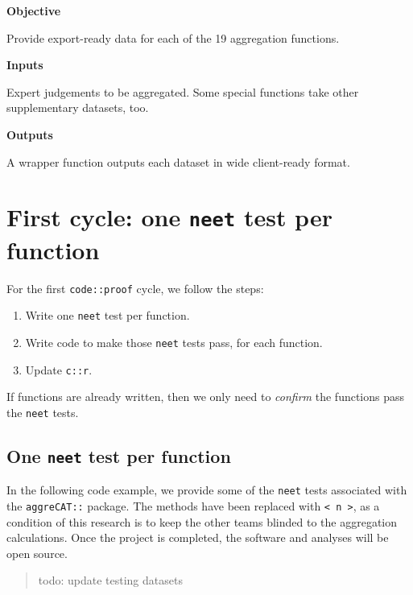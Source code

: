 \documentclass[
]{article}
\providecommand{\tightlist}{%
  \setlength{\itemsep}{0pt}\setlength{\parskip}{0pt}}
\begin{document}
\textbf{Objective}

Provide export-ready data for each of the 19 aggregation functions.

\textbf{Inputs}

Expert judgements to be aggregated. Some special functions take other supplementary datasets, too.

\textbf{Outputs}

A wrapper function outputs each dataset in wide client-ready format.

\hypertarget{first-cycle-one-neet-test-per-function}{%
\section{\texorpdfstring{First cycle: one \texttt{neet} test per function}{First cycle: one neet test per function}}\label{first-cycle-one-neet-test-per-function}}

For the first \texttt{code::proof} cycle, we follow the steps:

\begin{enumerate}
\def\labelenumi{\arabic{enumi}.}
\tightlist
\item
  Write one \texttt{neet} test per function.
\item
  Write code to make those \texttt{neet} tests pass, for each function.
\item
  Update \texttt{c::r}.
\end{enumerate}

If functions are already written, then we only need to \emph{confirm} the functions pass the \texttt{neet} tests.

\hypertarget{one-neet-test-per-function}{%
\subsection{\texorpdfstring{One \texttt{neet} test per function}{One neet test per function}}\label{one-neet-test-per-function}}

In the following code example, we provide some of the \texttt{neet} tests associated with the \texttt{aggreCAT::} package. The methods have been replaced with \texttt{\textless{}\ n\ \textgreater{}}, as a condition of this research is to keep the other teams blinded to the aggregation calculations. Once the project is completed, the software and analyses will be open source.

\begin{quote}
todo: update testing datasets
\end{quote}
\end{document}
